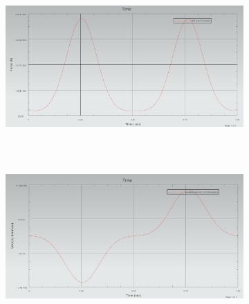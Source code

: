 \documentclass[12pt]{article}
\begin{document}
{\begin{figure}[H]
		\begin{subfigure}{0.49\textwidth}
			\centering\includegraphics[height=6cm,width=1\textwidth,keepaspectratio]{var4_1.jpeg}
			\caption{}
			\label{fig:var4_1.jpeg}
		\end{subfigure}
		\begin{subfigure}{0.49\textwidth}
			\centering\includegraphics[height=6cm,width=1\textwidth,keepaspectratio]{var4_2.jpeg}
			\caption{}
			\label{fig:var4_2.jpeg}
		\end{subfigure}
	\end{figure}
}
\end{document}
